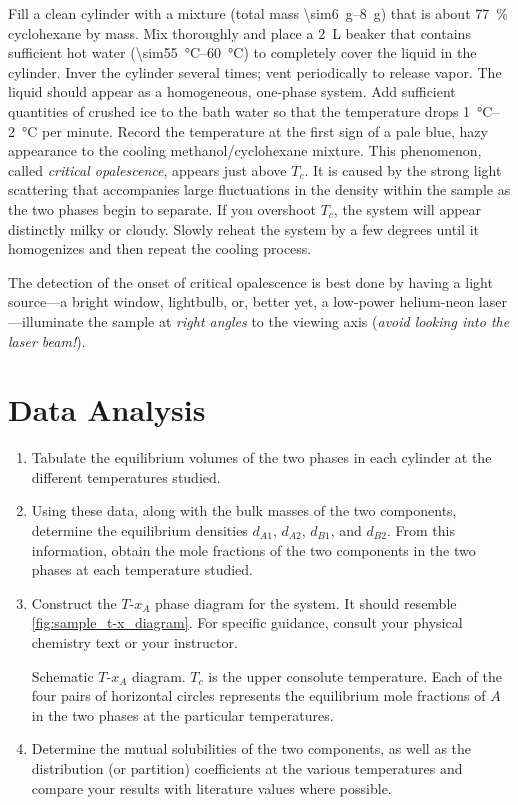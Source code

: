 \begin{enumerate}
	Fill a clean cylinder with a mixture (total mass \qtyrange{\sim6}{8}{\g}) that is about \qty{77}{\percent} cyclohexane by mass. 
	Mix thoroughly and place a \qty{2}{\L} beaker that contains sufficient hot water (\qtyrange{\sim55}{60}{\degreeCelsius}) to completely cover the liquid in the cylinder. 
	Inver the cylinder several times; vent periodically to release vapor. 
	The liquid should appear as a homogeneous, one-phase system. 
	Add sufficient quantities of crushed ice to the bath water so that the temperature drops \qtyrange{1}{2}{\degreeCelsius} per minute. 
	Record the temperature at the first sign of a pale blue, hazy appearance to the cooling methanol/cyclohexane mixture. 
	This phenomenon, called \emph{critical opalescence}, appears just above \(T_c\). 
	It is caused by the strong light scattering that accompanies large fluctuations in the density within the sample as the two phases begin to separate. 
	If you overshoot \(T_c\), the system will appear distinctly milky or cloudy. 
	Slowly reheat the system by a few degrees until it homogenizes and then repeat the cooling process. 
	
	The detection of the onset of critical opalescence is best done by having a light source---a bright window, lightbulb, or, better yet, a low-power helium-neon laser---illuminate the sample at \emph{right angles} to the viewing axis (\emph{avoid looking into the laser beam!}). 
\end{enumerate}

\section{Data Analysis}
\label{sec:data_analysis}

\begin{enumerate}
	\item Tabulate the equilibrium volumes of the two phases in each cylinder at the different temperatures studied. 
	\item Using these data, along with the bulk masses of the two components, determine the equilibrium densities \(d_{A1}\), \(d_{A2}\), \(d_{B1}\), and \(d_{B2}\). 
	From this information, obtain the mole fractions of the two components in the two phases at each temperature studied. 
	\item Construct the \(T\)-\(x_A\) phase diagram for the system. 
	It should resemble \cref{fig:sample_t-x_diagram}. 
	For specific guidance, consult your physical chemistry text or your instructor.
	\begin{marginfigure}
		\caption{Schematic \(T\)-\(x_A\) diagram. \(T_c\) is the upper consolute temperature. 
		Each of the four pairs of horizontal circles represents the equilibrium mole fractions of \(A\) in the two phases at the particular temperatures.}
		\label{fig:sample_t-x_diagram}
	\end{marginfigure}
	\item Determine the mutual solubilities of the two components, as well as the distribution (or partition) coefficients at the various temperatures and compare your results with literature values where possible.
\end{enumerate}

